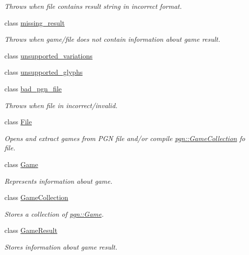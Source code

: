 \begin{DoxyCompactItemize}
\begin{DoxyCompactList}\small\item\em Throws when file contains result string in incorrect format. \item\end{DoxyCompactList}\item 
class \hyperlink{classpgn_1_1missing__result}{missing\_\-result}
\begin{DoxyCompactList}\small\item\em Throws when game/file does not contain information about game result. \item\end{DoxyCompactList}\item 
class \hyperlink{classpgn_1_1unsupported__variations}{unsupported\_\-variations}
\item 
class \hyperlink{classpgn_1_1unsupported__glyphs}{unsupported\_\-glyphs}
\item 
class \hyperlink{classpgn_1_1bad__pgn__file}{bad\_\-pgn\_\-file}
\begin{DoxyCompactList}\small\item\em Throws when file in incorrect/invalid. \item\end{DoxyCompactList}\item 
class \hyperlink{classpgn_1_1File}{File}
\begin{DoxyCompactList}\small\item\em Opens and extract games from PGN file and/or compile \hyperlink{classpgn_1_1GameCollection}{pgn::GameCollection} fo file. \item\end{DoxyCompactList}\item 
class \hyperlink{classpgn_1_1Game}{Game}
\begin{DoxyCompactList}\small\item\em Represents information about game. \item\end{DoxyCompactList}\item 
class \hyperlink{classpgn_1_1GameCollection}{GameCollection}
\begin{DoxyCompactList}\small\item\em Stores a collection of \hyperlink{classpgn_1_1Game}{pgn::Game}. \item\end{DoxyCompactList}\item 
class \hyperlink{classpgn_1_1GameResult}{GameResult}
\begin{DoxyCompactList}\small\item\em Stores information about game result. \item\end{DoxyCompactList}\item 

\end{DoxyCompactItemize}
